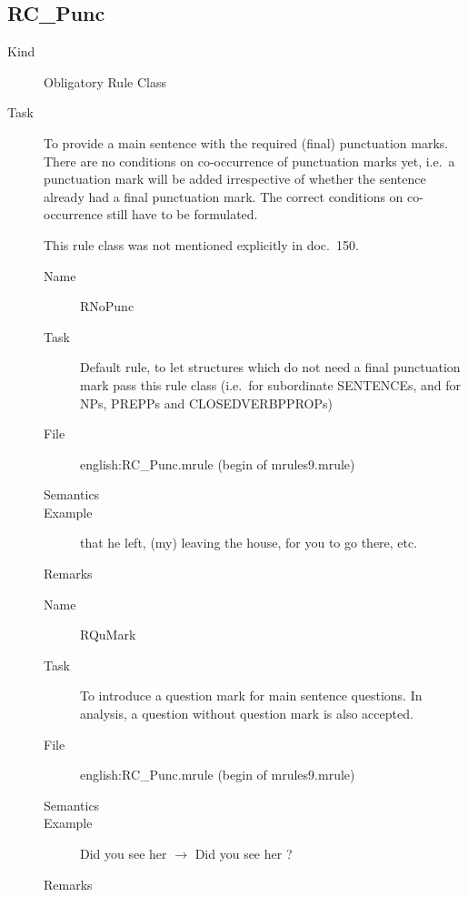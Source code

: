 \newpage
\subsection{RC\_Punc}
\begin{description}
\item[Kind] Obligatory Rule Class
\item[Task] To provide a main sentence with the required (final) punctuation 
marks. There are no conditions on co-occurrence of punctuation marks yet, i.e.\ 
a punctuation mark will be added irrespective of whether the sentence already 
had a final punctuation mark. The correct conditions on co-occurrence still 
have to be formulated.

This rule class was not mentioned explicitly in doc.\ 150.

\vspace{1 cm}
\begin{description}
\item[Name] RNoPunc
\item[Task] Default rule, to let structures which do not need a final 
punctuation mark pass this rule class (i.e.\ for subordinate SENTENCEs, and for 
NPs, PREPPs and CLOSEDVERBPPROPs)
\item[File] english:RC\_Punc.mrule (begin of mrules9.mrule)
\item[Semantics]
\item[Example] that he left, (my) leaving the house, for you to go there, etc.
\item[Remarks]
\end{description}

\vspace{1 cm}
\begin{description}
\item[Name] RQuMark
\item[Task] To introduce a question mark for main sentence questions. In 
analysis, a question without question mark is also accepted.
\item[File] english:RC\_Punc.mrule (begin of mrules9.mrule)
\item[Semantics]
\item[Example] Did you see her $\rightarrow$ Did you see her ?
\item[Remarks]
\end{description}


\end{description}
